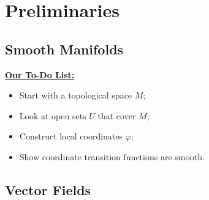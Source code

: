 \documentclass[UKenglish]{beamer}
\begin{document}
\section{Preliminaries}

\subsection{Smooth Manifolds}

\begin{frame}{}
\vfill
\textbf{\underline{Our To-Do List:}}
\begin{itemize}
	\item Start with a topological space $M$;
	\pause
	\item Look at open sets $U$ that cover $M$;
	\pause
	\item Construct local coordinates $\varphi$;
	\pause
	\item Show coordinate transition functions are smooth.
\end{itemize}
\vfill
\end{frame}

\begin{frame}{}
\vfill
\begin{figure}[H]
	\centering
	\def\svgwidth{0.75\columnwidth}
	
\end{figure}\vfill
\end{frame}

\begin{frame}{}
\vfill
\begin{figure}[H]
	\centering
	\def\svgwidth{.75\columnwidth}
	
\end{figure}
\vfill
\end{frame}

\begin{frame}{}
\vfill
\begin{figure}[H]
	\centering
	\def\svgwidth{\columnwidth}
	
\end{figure}
\vfill
\end{frame}

\subsection{Vector Fields}

\begin{frame}{}
\vfill
\begin{figure}[H]
	\centering
	\def\svgwidth{0.75\columnwidth}
	
\end{figure}
\vfill
\end{frame}
\end{document}
